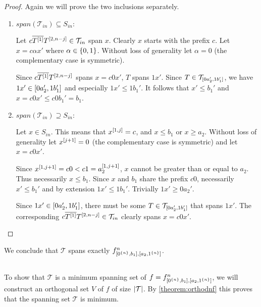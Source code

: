 \begin{proof}
Again
we will prove the two inclusions separately.
\begin{enumerate}
\item $span(\mathcal{T}_{in}) \subseteq S_{in}$:

Let $c \overline{T^{[1]}} T^{[2, n-j]} \in \mathcal{T}_{in}$ span $x$.
Clearly $x$ starts with the prefix $c$.
Let $x = c \alpha x'$ where $\alpha \in \{0, 1\}$.
Without loss of generality let $\alpha = 0$
(the complementary case is symmetric).

Since $c \overline{T^{[1]}} T^{[2, n-j]}$ spans
$x = c 0 x'$,
$T$ spans $1 x'$.
Since
$T \in \mathcal{T}_{[0 a_2', 1 b_1']}$,
we have $1 x' \in [0 a_2', 1 b_1']$
and especially $1 x' \leq 1 b_1'$.
It follows that $x' \leq b_1'$
and $x = c 0 x' \leq c 0 b_1' = b_1$.

\item $span(\mathcal{T}_{in}) \supseteq S_{in}$:

Let $x \in S_{in}$.
This means that $x^{[1, j]} = c$,
and $x \leq b_1$ or $x \geq a_2$.
Without loss of generality let $x^{[j+1]} = 0$
(the complementary case is symmetric)
and let $x = c 0 x'$.

Since $x^{[1, j+1]} = c 0 < c 1 = a_2^{[1, j+1]}$,
$x$ cannot be greater than or equal to $a_2$.
Thus necessarily $x \leq b_1$.
Since $x$ and $b_1$ share the prefix $c 0$,
necessarily $x' \leq b_1'$
and by extension $1 x' \leq 1 b_1'$.
Trivially $1 x' \geq 0 a_2'$.

Since $1 x' \in [0 a_2', 1 b_1']$,
there must be some
$T \in \mathcal{T}_{[0 a_2', 1 b_1']}$
that spans $1 x'$.
The corresponding
$c \overline{T^{[1]}} T^{[2, n-j]}
\in \mathcal{T}_{in}$ clearly spans $x = c 0 x'$.
\end{enumerate}
\end{proof}

We conclude that $\mathcal{T}$ spans exactly $f^{n}_{[0^{\{n\}}, b_1], [a_2, 1^{\{n\}}]}$.

\subsection{\titleoptimality}

To show that $\mathcal{T}$
is a minimum spanning set of $f = f^{n}_{[0^{\{n\}}, b_1], [a_2, 1^{\{n\}}]}$,
we will construct an orthogonal set $V$ of $f$
of size $\lvert\mathcal{T}\rvert$.
By \cref{theorem:orthodnf} this proves
that the spanning set $\mathcal{T}$ is minimum.

